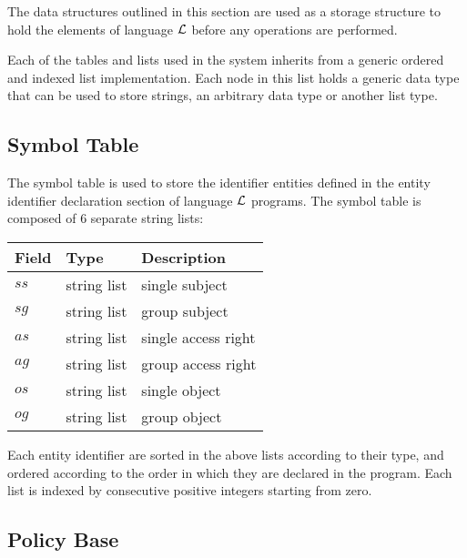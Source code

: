 \documentclass[global,twocolumn,final]{svjour}
\newenvironment{vquote}
  {\begin{list}{}{\leftmargin 1em}\item[]}
  {\end{list}}
\begin{document}
    The data structures outlined in this section are used as a storage
    structure to hold the elements of language ${\cal L}$ before any
    operations are performed.

    Each of the tables and lists used in the system inherits from a generic
    ordered and indexed list implementation. Each node in this list holds a
    generic data type that can be used to store strings, an arbitrary data
    type or another list type.

    \subsection{Symbol Table}

      The symbol table is used to store the identifier entities defined in
      the entity identifier declaration section of language ${\cal L}$
      programs. The symbol table is composed of 6 separate string lists:

      \begin{vquote}
        \begin{tabular}[t]{|l|l|l|}
          \hline
          \textbf{Field} & \textbf{Type} & \textbf{Description} \\
          \hline
          $ss$ & string list & single subject \\
          \hline
          $sg$ & string list & group subject \\
          \hline
          $as$ & string list & single access right \\
          \hline
          $ag$ & string list & group access right \\
          \hline
          $os$ & string list & single object \\
          \hline
          $og$ & string list & group object \\
          \hline
        \end{tabular}
      \end{vquote}

      Each entity identifier are sorted in the above lists according to
      their type, and ordered according to the order in which they are
      declared in the program. Each list is indexed by consecutive
      positive integers starting from zero.

    \subsection{Policy Base}
\end{document}
